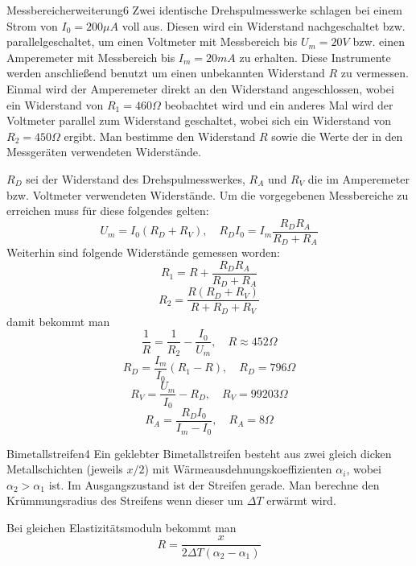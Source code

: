 \begin{problem}{Messbereicherweiterung}{6}
Zwei identische Drehspulmesswerke schlagen bei einem Strom von $I_0 = 200 \unit{\mu A}$ voll aus. Diesen wird ein Widerstand nachgeschaltet bzw. parallelgeschaltet, um einen Voltmeter mit Messbereich bis $U_m = 20 \unit{V}$ bzw. einen Amperemeter mit Messbereich bis $I_m = 20 \unit{mA}$ zu erhalten. Diese Instrumente werden anschließend benutzt um einen unbekannten Widerstand $R$ zu vermessen. Einmal wird der Amperemeter direkt an den Widerstand angeschlossen, wobei ein Widerstand von $R_1 = 460 \unit{\Omega}$ beobachtet wird und ein anderes Mal wird der Voltmeter parallel zum Widerstand geschaltet, wobei sich ein Widerstand von $R_2 = 450 \unit{\Omega}$ ergibt. Man bestimme den Widerstand $R$ sowie die Werte der in den Messgeräten verwendeten Widerstände.

\begin{solution}
$R_D$ sei der Widerstand des Drehspulmesswerkes, $R_A$ und $R_V$ die im Amperemeter bzw. Voltmeter verwendeten Widerstände. Um die vorgegebenen Messbereiche zu erreichen muss für diese folgendes gelten:
\[
U_m = I_0 (R_D + R_V), \quad R_D I_0 = I_m \frac{R_D R_A}{R_D+R_A}
\]
Weiterhin sind folgende Widerstände gemessen worden:
\[
R_1 = R + \frac{R_D R_A}{R_D+R_A}
\]
\[
R_2 = \frac{R (R_D+R_V)}{R+R_D+R_V}
\]
damit bekommt man
\[
\frac1R = \frac1{R_2} - \frac{I_0}{U_m}, \quad R \approx 452 \unit{\Omega}
\]
\[
R_D = \frac{I_m}{I_0} (R_1 - R), \quad R_D = 796 \unit{\Omega}
\]
\[
R_V = \frac{U_m}{I_0} - R_D, \quad R_V = 99203 \unit{\Omega}
\]
\[
R_A = \frac{R_D I_0}{I_m - I_0}, \quad R_A = 8 \unit{\Omega}
\]

\end{solution}

\end{problem}

\begin{problem}{Bimetallstreifen}{4}
Ein geklebter Bimetallstreifen besteht aus zwei gleich dicken Metallschichten (jeweils $x/2$) mit Wärmeausdehnungskoeffizienten $\alpha_i$, wobei $\alpha_2 > \alpha_1$ ist. Im Ausgangszustand ist der Streifen gerade. Man berechne den Krümmungsradius des Streifens wenn dieser um $\Delta T$ erwärmt wird.

\begin{solution}
Bei gleichen Elastizitätsmoduln bekommt man
\[
R = \frac{x}{2 \Delta T (\alpha_2-\alpha_1)}
\]
\end{solution}

\end{problem}

